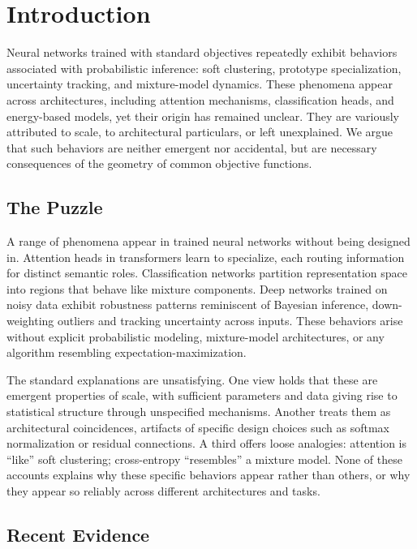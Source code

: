 \section{Introduction}

Neural networks trained with standard objectives repeatedly exhibit behaviors associated with probabilistic inference: soft clustering, prototype specialization, uncertainty tracking, and mixture-model dynamics. These phenomena appear across architectures, including attention mechanisms, classification heads, and energy-based models, yet their origin has remained unclear. They are variously attributed to scale, to architectural particulars, or left unexplained. We argue that such behaviors are neither emergent nor accidental, but are necessary consequences of the geometry of common objective functions.

\subsection{The Puzzle}

A range of phenomena appear in trained neural networks without being designed in. Attention heads in transformers learn to specialize, each routing information for distinct semantic roles. Classification networks partition representation space into regions that behave like mixture components. Deep networks trained on noisy data exhibit robustness patterns reminiscent of Bayesian inference, down-weighting outliers and tracking uncertainty across inputs. These behaviors arise without explicit probabilistic modeling, mixture-model architectures, or any algorithm resembling expectation-maximization.

The standard explanations are unsatisfying. One view holds that these are emergent properties of scale, with sufficient parameters and data giving rise to statistical structure through unspecified mechanisms. Another treats them as architectural coincidences, artifacts of specific design choices such as softmax normalization or residual connections. A third offers loose analogies: attention is ``like'' soft clustering; cross-entropy ``resembles'' a mixture model. None of these accounts explains why these specific behaviors appear rather than others, or why they appear so reliably across different architectures and tasks.

\subsection{Recent Evidence}
\label{sec:scoping}

